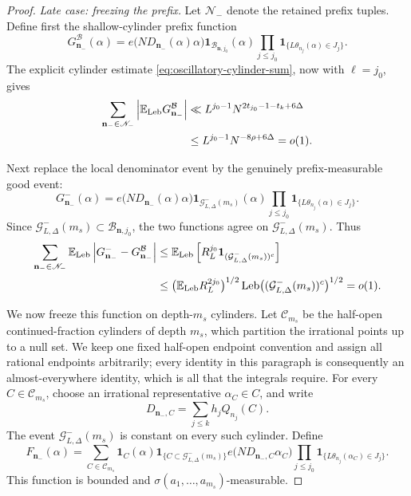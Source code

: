 \documentclass[11pt]{article}
\numberwithin{equation}{section}
\theoremstyle{definition}
\newcommand{\E}{\mathbb E}
\newcommand{\1}{\mathbf 1}
\newcommand{\Leb}{\operatorname{Leb}}
\begin{document}
\begin{proof}
\medskip
\noindent\emph{Late case: freezing the prefix.}
Let \(\mathscr N_-\) denote the retained prefix tuples.  Define first
the shallow-cylinder prefix function
\[
 G^{\mathcal B}_{\mathbf n_-}(\alpha)
 =
 e\bigl(ND_{\mathbf n_-}(\alpha)\alpha\bigr)
 \1_{\mathcal B_{\mathbf n,j_0}}(\alpha)
 \prod_{j\le j_0}
 \1_{\{L\theta_{n_j}(\alpha)\in J_j\}}.
\]
The explicit cylinder estimate
\eqref{eq:oscillatory-cylinder-sum}, now with \(\ell=j_0\), gives
\begin{align}
 \sum_{\mathbf n_-\in\mathscr N_-}
 \left|\E_{\rm Leb}G^{\mathcal B}_{\mathbf n_-}\right|
 &\ll
 L^{j_0-1}N^{2t_{j_0}-1-t_k+6\Delta} \notag\\
 &\le L^{j_0-1}N^{-8\rho+6\Delta}=o(1).
 \label{eq:shallow-prefix-zero}
\end{align}

Next replace the local denominator event by the genuinely
prefix-measurable good event:
\[
 G^-_{\mathbf n_-}(\alpha)
 =
 e\bigl(ND_{\mathbf n_-}(\alpha)\alpha\bigr)
 \1_{\mathcal G^-_{L,\Delta}(m_s)}(\alpha)
 \prod_{j\le j_0}
 \1_{\{L\theta_{n_j}(\alpha)\in J_j\}}.
\]
Since
\(\mathcal G^-_{L,\Delta}(m_s)\subset
  \mathcal B_{\mathbf n,j_0}\),
the two functions agree on
\(\mathcal G^-_{L,\Delta}(m_s)\).  Thus
\begin{align}
 \sum_{\mathbf n_-\in\mathscr N_-}
 \E_{\rm Leb}
 \left|G^-_{\mathbf n_-}
       -G^{\mathcal B}_{\mathbf n_-}\right|
 &\le
 \E_{\rm Leb}\left[
 R_L^{j_0}
 \1_{(\mathcal G^-_{L,\Delta}(m_s))^c}\right] \notag\\
 &\le
 \bigl(\E_{\rm Leb}R_L^{2j_0}\bigr)^{1/2}
 \Leb\bigl((\mathcal G^-_{L,\Delta}(m_s))^c\bigr)^{1/2}
 =o(1).
 \label{eq:prefix-good-replacement}
\end{align}

We now freeze this function on depth-\(m_s\) cylinders.  Let
\(\mathscr C_{m_s}\) be the half-open continued-fraction cylinders of
depth \(m_s\), which partition the irrational points up to a null set.
We keep one fixed half-open endpoint convention and assign all rational
endpoints arbitrarily; every identity in this paragraph is consequently
an almost-everywhere identity, which is all that the integrals require.
For every \(C\in\mathscr C_{m_s}\), choose
an irrational representative \(\alpha_C\in C\), and write
\[
 D_{\mathbf n_-,C}=\sum_{j\le k}h_jQ_{n_j}(C).
\]
The event \(\mathcal G^-_{L,\Delta}(m_s)\) is constant on every such
cylinder.  Define
\begin{equation}\label{eq:frozen-prefix-definition}
 F_{\mathbf n_-}(\alpha)
 =
 \sum_{C\in\mathscr C_{m_s}}
 \1_C(\alpha)
 \1_{\{C\subset\mathcal G^-_{L,\Delta}(m_s)\}}
 e\bigl(ND_{\mathbf n_-,C}\alpha_C\bigr)
 \prod_{j\le j_0}
 \1_{\{L\theta_{n_j}(\alpha_C)\in J_j\}}.
\end{equation}
This function is bounded and
\(\sigma(a_1,\ldots,a_{m_s})\)-measurable.


\end{proof}
\end{document}
